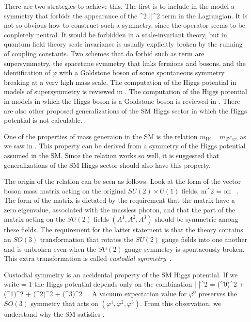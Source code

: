 \documentclass[12pt]{article}
\begin{document}
There are two strategies to achieve this.   The first is to include in
the model a symmetry that forbids the appearance of the 
\beq
                     \mu^2 |\varphi|^2 
term in the Lagrangian.   It is not so obvious how to construct such a
symmetry, since the operator  seems to be conpletely
neutral.   It would be forbidden in a scale-invariant theory, but in
quantum field theory scale invariance is usually explicitly broken by
the running of coupling constants.   Two schemes that do forbid such
as term are supersymmetry, the spacetime symmetry that links fermions
and bosons, and the identification of $\varphi$ with a Goldstone boson
of some spontaneous symmetry breaking at a very high mass scale.   The
computation of the Higgs potential in models of supersymmetry is
reviewed in \cite{Martin,mySUSY}.    The computation of the Higgs
potential in models in which the Higgs boson is a Goldstone boson is
reviewed in \cite{Contino,Gherghetta}.   There are also other 
 proposed generalizations of the SM Higgs sector in which  the Higgs potential is not calculable.

One of the properties of mass generaion in the SM is the
relation $m_W = m_Z c_w$, as we saw in .   This property
can be derived from a symmetry of the Higgs potential assumed in the
SM.  Since the relation works so well, it is suggested
that generalizations of the SM Higgs sector should also
have this property. 

The origin of the relation  can be seen as follows:
Look at the form of the vector boson mass matrix acting on the
original $SU(2)\times U(1)$ fields, 
\beq
 m^2 =    \qquad \mbox{on} \qquad
{} \  . 
\eeqn
The form of the matrix is dictated by the requirement that the matrix
have a zero eigenvalue, associated with the massless photon, and that
the part of the matrix acting on the $SU(2)$ fields  $(A^1, A^2, A^3)$
should be symmetric among these fields.  The
requirement for 
the latter statement is
that the theory contains an $SO(3)$ transformation that rotates the $SU(2)$
gauge fields into one another and is unbroken even when the $SU(2)$ gauge symmetry is
spontaeously broken.   This extra transformation is called {\it
  custodial symmetry}~\cite{SSVZ}. 

Custodial symmetry is an accidental property of the SM
Higgs potential.  If we write
\beq
      \varphi = {1\over {}}  
\eeqn
the Higgs potential depends only on the combination
\beq
   | \varphi|^2 =  (\varphi^0)^2 +  (\varphi^1)^2 +  (\varphi^2)^2 +
   (\varphi^3)^2 \ .
\eeqn
A vacuum expectation value for $\varphi^0$ preserves the $SO(3)$
symmetry that acts on  $(\varphi^1, \varphi^2, \varphi^3)$.   From
this observation, we understand why the SM satisfies
.
\end{document}
